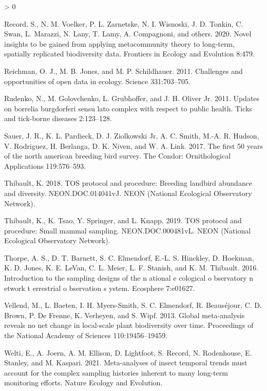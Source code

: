 \documentclass[
  12pt,
]{article}
\newlength{\cslhangindent}
\newenvironment{CSLReferences}[2] %
 {%
  \setlength{\parindent}{0pt}
  \ifodd #1 \everypar{\setlength{\hangindent}{\cslhangindent}}\ignorespaces\fi
  \ifnum #2 > 0
  \setlength{\parskip}{#2\baselineskip}
  \fi
 }%
 {}
\begin{document}
\begin{CSLReferences}{1}{0}
\leavevmode\hypertarget{ref-record2020novel}{}%
Record, S., N. M. Voelker, P. L. Zarnetske, N. I. Wisnoski, J. D. Tonkin, C. Swan, L. Marazzi, N. Lany, T. Lamy, A. Compagnoni, and others. 2020. Novel insights to be gained from applying metacommunity theory to long-term, spatially replicated biodiversity data. Frontiers in Ecology and Evolution 8:479.

\leavevmode\hypertarget{ref-reichman2011challenges}{}%
Reichman, O. J., M. B. Jones, and M. P. Schildhauer. 2011. Challenges and opportunities of open data in ecology. Science 331:703--705.

\leavevmode\hypertarget{ref-rudenko2011updates}{}%
Rudenko, N., M. Golovchenko, L. Grubhoffer, and J. H. Oliver Jr. 2011. Updates on borrelia burgdorferi sensu lato complex with respect to public health. Ticks and tick-borne diseases 2:123--128.

\leavevmode\hypertarget{ref-sauer2017first}{}%
Sauer, J. R., K. L. Pardieck, D. J. Ziolkowski Jr, A. C. Smith, M.-A. R. Hudson, V. Rodriguez, H. Berlanga, D. K. Niven, and W. A. Link. 2017. The first 50 years of the north american breeding bird survey. The Condor: Ornithological Applications 119:576--593.

\leavevmode\hypertarget{ref-thibault2018TOS}{}%
Thibault, K. 2018. TOS protocol and procedure: Breeding landbird abundance and diversity. NEON.DOC.014041vJ. NEON (National Ecological Observatory Network).

\leavevmode\hypertarget{ref-thibault2019TOS}{}%
Thibault, K., K. Tsao, Y. Springer, and L. Knapp. 2019. TOS protocol and procedure: Small mammal sampling. NEON.DOC.000481vL. NEON (National Ecological Observatory Network).

\leavevmode\hypertarget{ref-thorpe2016introduction}{}%
Thorpe, A. S., D. T. Barnett, S. C. Elmendorf, E.-L. S. Hinckley, D. Hoekman, K. D. Jones, K. E. LeVan, C. L. Meier, L. F. Stanish, and K. M. Thibault. 2016. Introduction to the sampling designs of the n ational e cological o bservatory n etwork t errestrial o bservation s ystem. Ecosphere 7:e01627.

\leavevmode\hypertarget{ref-vellend2013global}{}%
Vellend, M., L. Baeten, I. H. Myers-Smith, S. C. Elmendorf, R. Beauséjour, C. D. Brown, P. De Frenne, K. Verheyen, and S. Wipf. 2013. Global meta-analysis reveals no net change in local-scale plant biodiversity over time. Proceedings of the National Academy of Sciences 110:19456--19459.

\leavevmode\hypertarget{ref-welti2021meta}{}%
Welti, E., A. Joern, A. M. Ellison, D. Lightfoot, S. Record, N. Rodenhouse, E. Stanley, and M. Kaspari. 2021. Meta-analyses of insect temporal trends must account for the complex sampling histories inherent to many long-term monitoring efforts. Nature Ecology and Evolution.


\end{CSLReferences}
\end{document}
